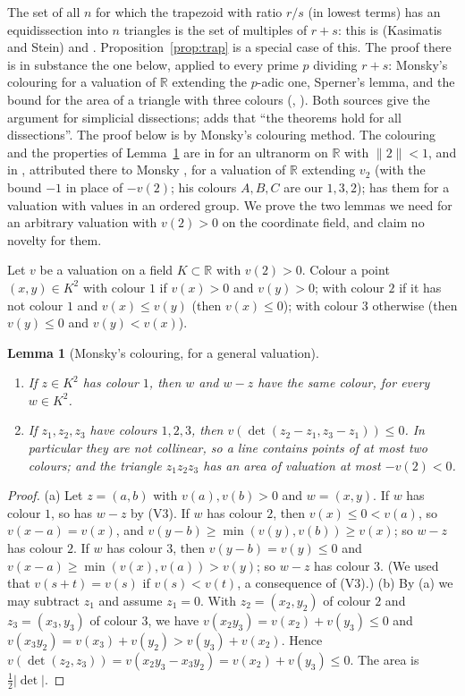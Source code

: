 \documentclass[11pt]{article}
\newtheorem{lemma}[theorem]{Lemma}
\theoremstyle{definition}
\newcommand{\R}{\mathbb{R}}
\begin{document}
The set of all $n$ for which the trapezoid with ratio $r/s$ (in lowest
terms) has an equidissection into $n$ triangles is the set of multiples of $r+s$: this is
\cite[Theorem 3.2]{KS} (Kasimatis and Stein) and \cite[Chapter 5, Theorem 3, pp.~122--123]{SS}.
Proposition~\ref{prop:trap} is a special case of this. The proof there is in substance the one
below, applied to every prime $p$ dividing $r+s$: Monsky's colouring for a valuation of $\R$
extending the $p$-adic one, Sperner's lemma, and the bound for the area of a triangle with three
colours (\cite[Theorem 0.1]{KS}, \cite[Chapter 5, Lemmas 1--3]{SS}). Both sources give the argument
for simplicial dissections; \cite[p.~107]{SS} adds that ``the theorems hold for all dissections''.
The proof below is by Monsky's colouring method. The
colouring and the properties of Lemma~\ref{lem:col} are in \cite[p.~163]{Mon70} for an ultranorm
on $\R$ with $\|2\|<1$, and in \cite[Section 2, Lemma
1]{Rud12}, attributed there to Monsky \cite{Mon70}, for a valuation of $\R$ extending $v_2$ (with
the bound $-1$ in place of $-v(2)$; his colours $A,B,C$ are our $1,3,2$); \cite[p.~158]{AZ} has
them for a valuation with values in an ordered group. We prove the two lemmas we
need for an arbitrary valuation with $v(2)>0$ on the coordinate field, and claim no novelty for
them.

Let $v$ be a valuation on a field $K\subset\R$ with $v(2)>0$. Colour a point $(x,y)\in K^2$ with
colour $1$ if $v(x)>0$ and $v(y)>0$; with colour $2$ if it has not colour $1$ and $v(x)\le v(y)$
(then $v(x)\le0$); with colour $3$ otherwise (then $v(y)\le0$ and $v(y)<v(x)$).

\begin{lemma}[Monsky's colouring, for a general valuation]\label{lem:col}
\begin{enumerate}[label=(\alph*)]
\item If $z\in K^2$ has colour $1$, then $w$ and $w-z$ have the same colour, for every $w\in K^2$.
\item If $z_1,z_2,z_3$ have colours $1,2,3$, then $v(\det(z_2-z_1,z_3-z_1))\le0$. In particular they
are not collinear, so a line contains points of at most two colours; and the triangle
$z_1z_2z_3$ has an area of valuation at most $-v(2)<0$.
\end{enumerate}
\end{lemma}

\begin{proof}
(a) Let $z=(a,b)$ with $v(a),v(b)>0$ and $w=(x,y)$. If $w$ has colour $1$, so has $w-z$ by (V3). If
$w$ has colour $2$, then $v(x)\le0<v(a)$, so $v(x-a)=v(x)$, and
$v(y-b)\ge\min(v(y),v(b))\ge v(x)$; so $w-z$ has colour $2$. If $w$ has colour $3$, then
$v(y-b)=v(y)\le0$ and $v(x-a)\ge\min(v(x),v(a))>v(y)$; so $w-z$ has colour $3$. (We used that
$v(s+t)=v(s)$ if $v(s)<v(t)$, a consequence of (V3).)
(b) By (a) we may subtract $z_1$ and assume $z_1=0$. With $z_2=(x_2,y_2)$ of colour $2$ and
$z_3=(x_3,y_3)$ of colour $3$, we have $v(x_2y_3)=v(x_2)+v(y_3)\le0$ and
$v(x_3y_2)=v(x_3)+v(y_2)>v(y_3)+v(x_2)$. Hence $v(\det(z_2,z_3))=v(x_2y_3-x_3y_2)=v(x_2)+v(y_3)\le0$.
The area is $\tfrac12|\det|$.
\end{proof}
\end{document}
